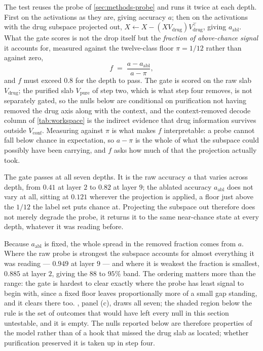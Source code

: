 The test reuses the probe of \cref{sec:methods-probe} and runs it twice at each
depth. First on the activations as they are, giving accuracy $a$; then on the
activations with the drug subspace projected out, $X \leftarrow X - (X
V_{\textrm{drug}})V_{\textrm{drug}}^{\top}$, giving $a_{\textrm{abl}}$. What the
gate scores is not the drop itself but the \emph{fraction of above-chance
signal} it accounts for, measured against the twelve-class floor $\pi = 1/12$
rather than against zero,
\begin{equation}
  f \;=\; \frac{a - a_{\textrm{abl}}}{a - \pi} ,
\end{equation}
and $f$ must exceed $0.8$ for the depth to pass. The gate is scored on the raw slab $V_{\textrm{drug}}$; the purified slab $V_{\textrm{pure}}$ of step two, which is what step four removes, is not separately gated, so the nulls below are conditional on purification not having removed the drug axis along with the context, and the context-removed decode column of \cref{tab:workspace} is the indirect evidence that drug information survives outside $V_{\textrm{conf}}$. Measuring against $\pi$ is what
makes $f$ interpretable: a probe cannot fall below chance in expectation, so
$a - \pi$ is the whole of what the subspace could possibly have been carrying,
and $f$ asks how much of that the projection actually took.

The gate passes at all seven depths. It is the raw accuracy $a$ that varies
across depth, from $0.41$ at layer $2$ to $0.82$ at layer $9$; the ablated
accuracy $a_{\textrm{abl}}$ does not vary at all, sitting at $0.121$ wherever
the projection is applied, a floor just above the $1/12$ the label set puts
chance at. Projecting the subspace out therefore does not merely degrade the
probe, it returns it to the same near-chance state at every depth, whatever it
was reading before.

Because $a_{\textrm{abl}}$ is fixed, the whole spread in the removed fraction
comes from $a$. Where the raw probe is strongest the subspace accounts for
almost everything it was reading --- $0.949$ at layer $9$ --- and where it is
weakest the fraction is smallest, $0.885$ at layer $2$, giving the $88$ to
$95\%$ band. The ordering matters more than the range: the gate is hardest to
clear exactly where the probe has least signal to begin with, since a fixed
floor leaves proportionally more of a small gap standing, and it clears there
too. , panel (c), draws all seven; the shaded region below the
rule is the set of outcomes that would have left every null in this section
untestable, and it is empty. The nulls reported below are therefore properties of the model rather than of a hook that missed the drug slab as located; whether purification preserved it is taken up in step four.

